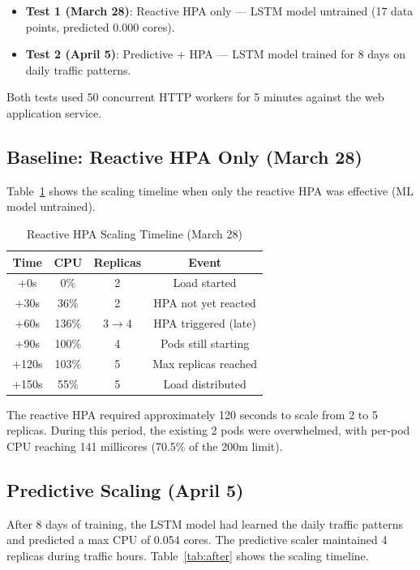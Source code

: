 \documentclass[journal]{IEEEtran}
\begin{document}
\begin{itemize}
    \item \textbf{Test 1 (March 28)}: Reactive HPA only --- LSTM model untrained (17 data points, predicted 0.000 cores).
    \item \textbf{Test 2 (April 5)}: Predictive + HPA --- LSTM model trained for 8 days on daily traffic patterns.
\end{itemize}

Both tests used 50 concurrent HTTP workers for 5 minutes against the web application service.

\subsection{Baseline: Reactive HPA Only (March 28)}
Table~\ref{tab:before} shows the scaling timeline when only the reactive HPA was effective (ML model untrained).

\begin{table}[h]
\centering
\caption{Reactive HPA Scaling Timeline (March 28)}
\label{tab:before}
\begin{tabular}{@{}cccc@{}}
\toprule
\textbf{Time} & \textbf{CPU} & \textbf{Replicas} & \textbf{Event} \\
\midrule
+0s & 0\% & 2 & Load started \\
+30s & 36\% & 2 & HPA not yet reacted \\
+60s & 136\% & 3$\rightarrow$4 & HPA triggered (late) \\
+90s & 100\% & 4 & Pods still starting \\
+120s & 103\% & 5 & Max replicas reached \\
+150s & 55\% & 5 & Load distributed \\
\bottomrule
\end{tabular}
\end{table}

The reactive HPA required approximately 120 seconds to scale from 2 to 5 replicas. During this period, the existing 2 pods were overwhelmed, with per-pod CPU reaching 141 millicores (70.5\% of the 200m limit).

\subsection{Predictive Scaling (April 5)}
After 8 days of training, the LSTM model had learned the daily traffic patterns and predicted a max CPU of 0.054 cores. The predictive scaler maintained 4 replicas during traffic hours. Table~\ref{tab:after} shows the scaling timeline.
\end{document}
